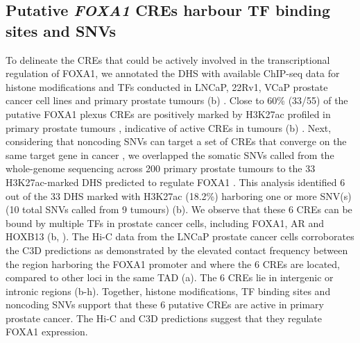 
\subsection{Putative \emph{FOXA1} CREs harbour TF binding sites and SNVs}

To delineate the CREs that could be actively involved in the transcriptional regulation of FOXA1, we annotated the DHS with available ChIP-seq data for histone modifications and TFs conducted in LNCaP, 22Rv1, VCaP prostate cancer cell lines and primary prostate tumours (b) \cite{pomerantzAndrogenReceptorCistrome2015,kronTMPRSS2ERGFusion2017}.
Close to 60\% (33/55) of the putative FOXA1 plexus CREs are positively marked by H3K27ac profiled in primary prostate tumours \cite{kronTMPRSS2ERGFusion2017}, indicative of active CREs in tumours (b) \cite{creyghtonHistoneH3K27acSeparates2010}.
Next, considering that noncoding SNVs can target a set of CREs that converge on the same target gene in cancer \cite{baileyNoncodingSomaticInherited2016}, we overlapped the somatic SNVs called from the whole-genome sequencing across 200 primary prostate tumours to the 33 H3K27ac-marked DHS predicted to regulate FOXA1 \cite{fraserGenomicHallmarksLocalized2017,espirituEvolutionaryLandscapeLocalized2018}.
This analysis identified 6 out of the 33 DHS marked with H3K27ac (18.2\%) harboring one or more SNV(s) (10 total SNVs called from 9 tumours) (b).
We observe that these 6 CREs can be bound by multiple TFs in prostate cancer cells, including FOXA1, AR and HOXB13 (b, ).
The Hi-C data from the LNCaP prostate cancer cells corroborates the C3D predictions as demonstrated by the elevated contact frequency between the region harboring the FOXA1 promoter and where the 6 CREs are located, compared to other loci in the same TAD (a).
The 6 CREs lie in intergenic or intronic regions (b-h).
Together, histone modifications, TF binding sites and noncoding SNVs support that these 6 putative CREs are active in primary prostate cancer.
The Hi-C and C3D predictions suggest that they regulate FOXA1 expression.

